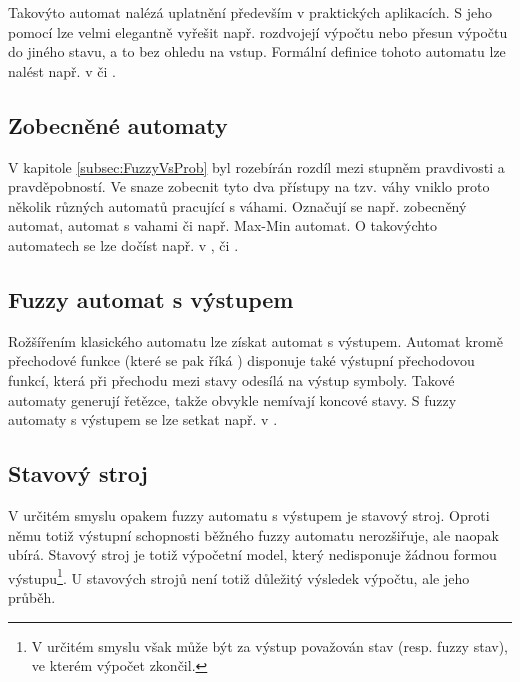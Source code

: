 \documentclass[a4paper,10pt]{article}
\begin{document}
Takovýto automat nalézá uplatnění především v praktických aplikacích. S jeho pomocí lze velmi elegantně vyřešit např. rozdvojejí výpočtu nebo přesun výpočtu do jiného stavu, a to bez ohledu na vstup. Formální definice tohoto automatu lze nalést např. v \cite{SnaKepAbrHas-AproxStriMatchFuzzAut} či \cite{LiLiLi-RelAmoSevTypFuzAut}. 

\subsection{Zobecněné automaty}
V kapitole \ref{subsec:FuzzyVsProb} byl rozebírán rozdíl mezi stupněm pravdivosti a pravděpobností. Ve snaze zobecnit tyto dva přístupy na tzv. váhy vniklo proto několik různých automatů pracující s váhami. Označují se např. zobecněný automat, automat s vahami či např. Max-Min automat. O takovýchto automatech se lze dočíst např. v \cite{MorMal-FuzzyAutLang}, \cite{DooKre-NewDirFuzzAut} či \cite{San-MaxAut}. 

\subsection{Fuzzy automat s výstupem}
Rožšířením klasického automatu lze získat automat s výstupem. Automat kromě přechodové funkce (které se pak říká ) disponuje také výstupní přechodovou funkcí, která při přechodu mezi stavy odesílá na výstup symboly. Takové automaty generují řetězce, takže obvykle nemívají koncové stavy. S fuzzy automaty s výstupem se lze setkat např. v \cite{BlaDelPeg-FuzzAutIndUsNeuNet}\cite{PedGac-LeaFuzzAut}\cite{BlaDelPeg-FuzzGraIntUsiNeuNet}\cite{CheMo-MinAlgFuzFinAut}\cite{ThoMar-DetAccRegFuzLang}.

\subsection{Stavový stroj}
V určitém smyslu opakem fuzzy automatu s výstupem je stavový stroj. Oproti němu totiž výstupní schopnosti běžného fuzzy automatu nerozšiřuje, ale naopak ubírá. Stavový stroj je totiž výpočetní model, který nedisponuje žádnou formou výstupu\footnote{V určitém smyslu však může být za výstup považován stav (resp. fuzzy stav), ve kterém výpočet zkončil.}. U stavových strojů není totiž důležitý výsledek výpočtu, ale jeho průběh.
\end{document}
